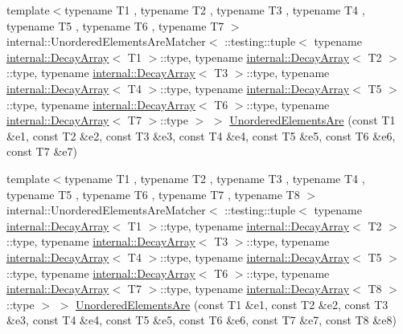 \begin{DoxyCompactItemize}
{\footnotesize template$<$typename T1 , typename T2 , typename T3 , typename T4 , typename T5 , typename T6 , typename T7 $>$ }\\internal\+::\+Unordered\+Elements\+Are\+Matcher$<$ \+::testing\+::tuple$<$ typename \mbox{\hyperlink{structtesting_1_1internal_1_1_decay_array}{internal\+::\+Decay\+Array}}$<$ T1 $>$\+::type, typename \mbox{\hyperlink{structtesting_1_1internal_1_1_decay_array}{internal\+::\+Decay\+Array}}$<$ T2 $>$\+::type, typename \mbox{\hyperlink{structtesting_1_1internal_1_1_decay_array}{internal\+::\+Decay\+Array}}$<$ T3 $>$\+::type, typename \mbox{\hyperlink{structtesting_1_1internal_1_1_decay_array}{internal\+::\+Decay\+Array}}$<$ T4 $>$\+::type, typename \mbox{\hyperlink{structtesting_1_1internal_1_1_decay_array}{internal\+::\+Decay\+Array}}$<$ T5 $>$\+::type, typename \mbox{\hyperlink{structtesting_1_1internal_1_1_decay_array}{internal\+::\+Decay\+Array}}$<$ T6 $>$\+::type, typename \mbox{\hyperlink{structtesting_1_1internal_1_1_decay_array}{internal\+::\+Decay\+Array}}$<$ T7 $>$\+::type $>$ $>$ \mbox{\hyperlink{namespacetesting_add6e16fe24c45e39e92c0d19c04acf11}{Unordered\+Elements\+Are}} (const T1 \&e1, const T2 \&e2, const T3 \&e3, const T4 \&e4, const T5 \&e5, const T6 \&e6, const T7 \&e7)
\item 
{\footnotesize template$<$typename T1 , typename T2 , typename T3 , typename T4 , typename T5 , typename T6 , typename T7 , typename T8 $>$ }\\internal\+::\+Unordered\+Elements\+Are\+Matcher$<$ \+::testing\+::tuple$<$ typename \mbox{\hyperlink{structtesting_1_1internal_1_1_decay_array}{internal\+::\+Decay\+Array}}$<$ T1 $>$\+::type, typename \mbox{\hyperlink{structtesting_1_1internal_1_1_decay_array}{internal\+::\+Decay\+Array}}$<$ T2 $>$\+::type, typename \mbox{\hyperlink{structtesting_1_1internal_1_1_decay_array}{internal\+::\+Decay\+Array}}$<$ T3 $>$\+::type, typename \mbox{\hyperlink{structtesting_1_1internal_1_1_decay_array}{internal\+::\+Decay\+Array}}$<$ T4 $>$\+::type, typename \mbox{\hyperlink{structtesting_1_1internal_1_1_decay_array}{internal\+::\+Decay\+Array}}$<$ T5 $>$\+::type, typename \mbox{\hyperlink{structtesting_1_1internal_1_1_decay_array}{internal\+::\+Decay\+Array}}$<$ T6 $>$\+::type, typename \mbox{\hyperlink{structtesting_1_1internal_1_1_decay_array}{internal\+::\+Decay\+Array}}$<$ T7 $>$\+::type, typename \mbox{\hyperlink{structtesting_1_1internal_1_1_decay_array}{internal\+::\+Decay\+Array}}$<$ T8 $>$\+::type $>$ $>$ \mbox{\hyperlink{namespacetesting_a0f30358234947d21c7f39f15a8395d04}{Unordered\+Elements\+Are}} (const T1 \&e1, const T2 \&e2, const T3 \&e3, const T4 \&e4, const T5 \&e5, const T6 \&e6, const T7 \&e7, const T8 \&e8)

\end{DoxyCompactItemize}
